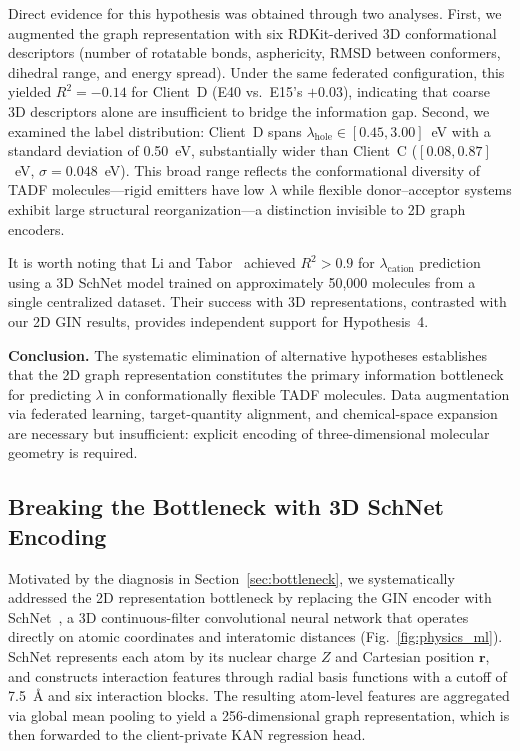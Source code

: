 \documentclass[twocolumn]{article}
\newcommand{\lam}{\lambda}
\newcommand{\lamhole}{\lambda_{\text{hole}}}
\newcommand{\lamcat}{\lambda_{\text{cation}}}
\newcommand{\Rsq}{R^{2}}
\begin{document}
Direct evidence for this hypothesis was obtained through two analyses.
First, we augmented the graph representation with six RDKit-derived 3D conformational descriptors (number of rotatable bonds, asphericity, RMSD between conformers, dihedral range, and energy spread).
Under the same federated configuration, this yielded $\Rsq = -0.14$ for Client~D (E40 vs.\ E15's $+0.03$), indicating that coarse 3D descriptors alone are insufficient to bridge the information gap.
Second, we examined the label distribution: Client~D spans $\lamhole \in [0.45, 3.00]$~eV with a standard deviation of 0.50~eV, substantially wider than Client~C ($[0.08, 0.87]$~eV, $\sigma = 0.048$~eV).
This broad range reflects the conformational diversity of TADF molecules---rigid emitters have low $\lam$ while flexible donor--acceptor systems exhibit large structural reorganization---a distinction invisible to 2D graph encoders.

It is worth noting that Li and Tabor~\cite{Li2023_SchNet} achieved $\Rsq > 0.9$ for $\lamcat$ prediction using a 3D SchNet model trained on approximately 50{,}000 molecules from a single centralized dataset.
Their success with 3D representations, contrasted with our 2D GIN results, provides independent support for Hypothesis~4.

\textbf{Conclusion.}
The systematic elimination of alternative hypotheses establishes that the 2D graph representation constitutes the primary information bottleneck for predicting $\lam$ in conformationally flexible TADF molecules.
Data augmentation via federated learning, target-quantity alignment, and chemical-space expansion are necessary but insufficient: explicit encoding of three-dimensional molecular geometry is required.

\subsection{Breaking the Bottleneck with 3D SchNet Encoding}\label{sec:schnet}

Motivated by the diagnosis in Section~\ref{sec:bottleneck}, we systematically addressed the 2D representation bottleneck by replacing the GIN encoder with SchNet~\cite{Schutt2018_SchNet}, a 3D continuous-filter convolutional neural network that operates directly on atomic coordinates and interatomic distances (Fig.~\ref{fig:physics_ml}).
SchNet represents each atom by its nuclear charge $Z$ and Cartesian position $\mathbf{r}$, and constructs interaction features through radial basis functions with a cutoff of 7.5~\AA{} and six interaction blocks.
The resulting atom-level features are aggregated via global mean pooling to yield a 256-dimensional graph representation, which is then forwarded to the client-private KAN regression head.
\end{document}
